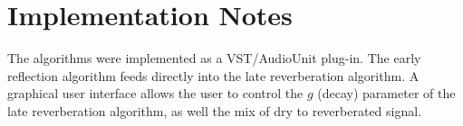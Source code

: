 \documentclass{scrartcl}
\begin{document}
\section{Implementation Notes}
The algorithms were implemented as a VST/AudioUnit plug-in. The early reflection algorithm feeds directly into the late reverberation algorithm. A graphical user interface allows the user to control the $g$ (decay) parameter of the late reverberation algorithm, as well the mix of dry to reverberated signal.

\begin{landscape}

\end{landscape}

\begin{landscape}

\end{landscape}




\end{document}
